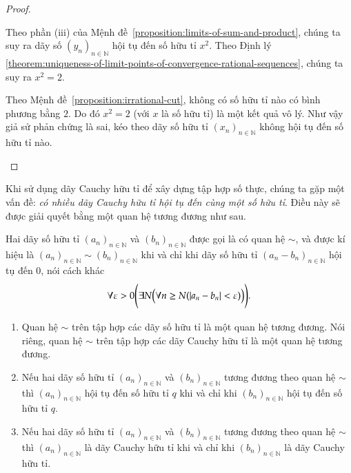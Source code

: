 \begin{proof}
\begin{enumerate}[label={\textbf{Bước \arabic*.}},itemindent=1cm]
              Theo phần (iii) của Mệnh đề~\ref{proposition:limits-of-sum-and-product}, chúng ta suy ra dãy số ${(y_{n})}_{n\in\mathbb{N}}$ hội tụ đến số hữu tỉ $x^{2}$. Theo Định lý~
              \ref{theorem:uniqueness-of-limit-points-of-convergence-rational-sequences}, chúng ta suy ra $x^{2} = 2$.

              Theo Mệnh đề~\ref{proposition:irrational-cut}, không có số hữu tỉ nào có bình phương bằng $2$. Do đó $x^{2} = 2$ (với $x$ là số hữu tỉ) là một kết quả vô lý. Như vậy giả sử phản chứng là sai, kéo theo dãy số hữu tỉ ${(x_{n})}_{n\in\mathbb{N}}$ không hội tụ đến số hữu tỉ nào.
    \end{enumerate}
\end{proof}

Khi sử dụng dãy Cauchy hữu tỉ để xây dựng tập hợp số thực, chúng ta gặp một vấn đề: \textit{có nhiều dãy Cauchy hữu tỉ hội tụ đến cùng một số hữu tỉ}. Điều này sẽ được giải quyết bằng một quan hệ tương đương như sau.

\begin{theorem}\label{theorem:equivalent-rational-sequences}
    Hai dãy số hữu tỉ ${(a_{n})}_{n\in\mathbb{N}}$ và ${(b_{n})}_{n\in\mathbb{N}}$ được gọi là có quan hệ $\sim$, và được kí hiệu là ${(a_{n})}_{n\in\mathbb{N}} \sim {(b_{n})}_{n\in\mathbb{N}}$ khi và chỉ khi dãy số hữu tỉ ${(a_{n} - b_{n})}_{n\in\mathbb{N}}$ hội tụ đến $0$, nói cách khác
    \[
        \forall\varepsilon > 0\Biggl( \exists N \Bigl( \forall n\geq N ( \left\vert{a_{n} - b_{n}}\right\vert < \varepsilon ) \Bigr) \Biggr).
    \]
    \begin{enumerate}[label={(\roman*)},itemsep=0pt]
        \item Quan hệ $\sim$ trên tập hợp các dãy số hữu tỉ là một quan hệ tương đương. Nói riêng, quan hệ $\sim$ trên tập hợp các dãy Cauchy hữu tỉ là một quan hệ tương đương.
        \item Nếu hai dãy số hữu tỉ ${(a_{n})}_{n\in\mathbb{N}}$ và ${(b_{n})}_{n\in\mathbb{N}}$ tương đương theo quan hệ $\sim$ thì ${(a_{n})}_{n\in\mathbb{N}}$ hội tụ đến số hữu tỉ $q$ khi và chỉ khi ${(b_{n})}_{n\in\mathbb{N}}$ hội tụ đến số hữu tỉ $q$.
        \item Nếu hai dãy số hữu tỉ ${(a_{n})}_{n\in\mathbb{N}}$ và ${(b_{n})}_{n\in\mathbb{N}}$ tương đương theo quan hệ $\sim$ thì ${(a_{n})}_{n\in\mathbb{N}}$ là dãy Cauchy hữu tỉ khi và chỉ khi ${(b_{n})}_{n\in\mathbb{N}}$ là dãy Cauchy hữu tỉ.
    \end{enumerate}
\end{theorem}

